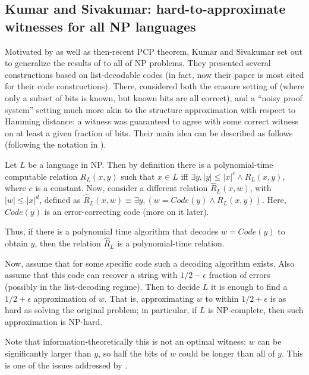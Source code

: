 \subsection{Kumar and Sivakumar: hard-to-approximate witnesses for all NP languages}

Motivated by \cite{GHLP99} as well as then-recent PCP theorem, Kumar
and Sivakumar \cite{KS99} set out to generalize the results of
\cite{GHLP99} to all of NP problems.  They presented several
constructions based on list-decodable
codes (in fact, now their paper is most cited for their code
constructions). There, \cite{KS99} considered both the erasure setting of
\cite{GHLP99} (where only a subset of bits is known, but known bits
are all correct), and a ``noisy proof system'' setting much more akin
to the structure approximation with respect to Hamming distance: a witness was
guaranteed to agree with some correct witness on at least a given
fraction of bits. Their main idea can be described as follows
(following the notation in \cite{FLN00}). 

\begin{definition}\label{R-hat}
Let $L$ be a language in NP. Then by definition there is a
polynomial-time computable relation $R_L(x,y)$ such that $x \in L$ iff
$\exists y, |y| \leq |x|^c \wedge R_L(x,y)$, where $c$ is a
constant. Now, consider a different relation $\hat{R}_L(x,w)$, with
$|w|\leq |x|^d$, defined as $\hat{R}_L(x,w) \equiv \exists y,
(w=Code(y) \wedge R_L(x,y))$. Here, $Code(y)$ is an error-correcting
code (more on it later).  
\end{definition}

Thus, if there is a polynomial time algorithm that decodes $w=Code(y)$
to obtain $y$, then the relation $\hat{R}_L$ is a polynomial-time
relation.

Now, assume that for some specific code such a decoding algorithm
exists. Also assume that this code can recover a string with
$1/2-\epsilon$ fraction of errors (possibly in the list-decoding
regime). Then to decide $L$ it is enough to find a $1/2+\epsilon$
approximation of $w$. That is, approximating $w$ to within
$1/2+\epsilon$ is as hard as solving the original problem; in
particular, if $L$ is NP-complete, then such approximation is NP-hard.

Note that information-theoretically this is not an optimal witness:
$w$ can be significantly larger than $y$, so half the bits of $w$
could be longer than all of $y$. This is one of the issues addressed by
\cite{FLN00}. 

